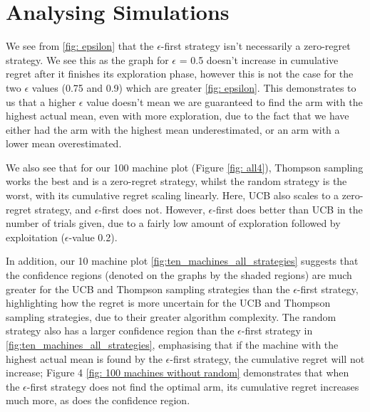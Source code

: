 \section{Analysing Simulations}\label{sec:analysing-simulations}
We see from \ref{fig: epsilon} that the $\epsilon$-first strategy isn't necessarily a zero-regret strategy.
We see this as the graph for $\epsilon$ = 0.5 doesn't increase in cumulative regret after it finishes its exploration phase, however this is not the case for the two $\epsilon$ values (0.75 and 0.9) which are greater \ref{fig: epsilon}.
This demonstrates to us that a higher $\epsilon$ value doesn't mean we are guaranteed to find the arm with the highest actual mean, even with more exploration, due to the fact that we have either had the arm with the highest mean underestimated, or an arm with a lower mean overestimated.

We also see that for our 100 machine plot (Figure \ref{fig: all4}), Thompson sampling works the best and is a zero-regret strategy, whilst the random strategy is the worst, with its cumulative regret scaling linearly.
Here, UCB also scales to a zero-regret strategy, and $\epsilon$-first does not.
However, $\epsilon$-first does better than UCB in the number of trials given, due to a fairly low amount of exploration followed by exploitation ($\epsilon$-value 0.2).

In addition, our 10 machine plot \ref{fig:ten_machines_all_strategies}   suggests that the confidence regions (denoted on the graphs by the shaded regions) are much greater for the UCB and Thompson sampling strategies than the $\epsilon$-first strategy, highlighting how the regret is more uncertain for the UCB and Thompson sampling strategies, due to their greater algorithm complexity.
The random strategy also has a larger confidence region than the $\epsilon$-first strategy in \ref{fig:ten_machines_all_strategies}, emphasising that if the machine with the highest actual mean is found by the $\epsilon$-first strategy, the cumulative regret will not increase; Figure 4 \ref{fig: 100 machines without random} demonstrates that when the $\epsilon$-first strategy does not find the optimal arm, its cumulative regret increases much more, as does the confidence region.
